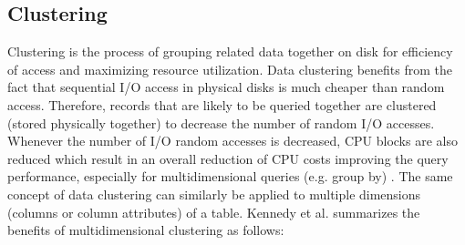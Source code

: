 \documentclass[12pt,a4paper]{article}
\begin{document}
\begin{table}[!t]
\centering
{}
\caption{Types of horizontal partitioning}
\label{tab:horpartition}
\end{table}

\subsection{Clustering}
Clustering is the process of grouping related data together on disk for efficiency of access and maximizing resource utilization. Data clustering benefits from
the fact that sequential I/O access in physical disks is much cheaper than random access. Therefore, records that are likely to be queried together are
clustered (stored physically together) to decrease the number of random I/O accesses. Whenever the number of I/O random accesses is decreased, CPU blocks are
also reduced which result in an overall reduction of CPU costs improving the query performance, especially for multidimensional queries (e.g. group by)
\cite{lightstone2007physical}. The same concept of data clustering can similarly be applied to multiple dimensions (columns or column attributes) of a table.
Kennedy et al. \cite{kennedy2005} summarizes the benefits of multidimensional clustering as follows:
\end{document}
